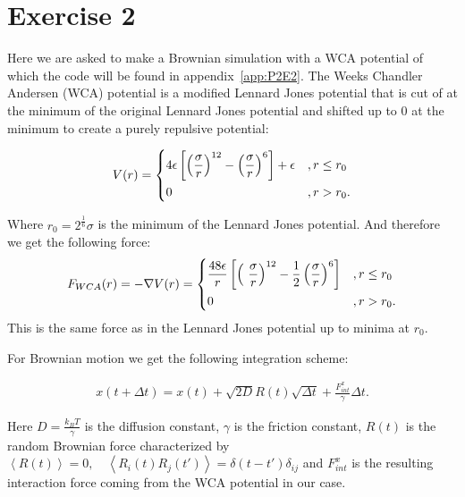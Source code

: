 \section{Exercise 2}\label{sect: P2E2}
Here we are asked to make a Brownian simulation with a WCA potential of which the code will be found in appendix~\ref{app:P2E2}.
The Weeks Chandler Andersen (WCA) potential is a modified Lennard Jones potential that is cut of at the minimum of the original Lennard Jones potential 
and shifted up to 0 at the minimum to create a purely repulsive potential:

\begin{align}
V(r) = \begin{dcases} 4 \epsilon \left[\left( \frac{\sigma}{r} \right)^{12} - \left( \frac{\sigma}{r} \right)^6\right] + \epsilon &,r \le  r_0 \\ 0  &,r > r_0. \end{dcases}
\end{align}\label{eq: WCA potential}

Where $r_0 = 2^{\frac{1}{6}} \sigma$ is the minimum of the Lennard Jones potential. And therefore we get the following force:
\begin{align}
F_{WCA}(r) = - \nabla V(r) = \begin{dcases} \frac{48 \epsilon}{r} \left[ \left(\ \frac{\sigma}{r}\right)^{12}-\frac{1}{2}\left(\frac{\sigma}{r}\right)^6\right]   &,r \le  r_0 \\ 0  &,r > r_0. \end{dcases}
\end{align}\label{eq: WCA force}
This is the same force as in the Lennard Jones potential up to minima at $r_0$.

For Brownian motion we get the following integration scheme:

\begin{align}
    x(t +\Delta t) = x(t) + \sqrt{2D}R(t)\sqrt{\Delta t} + \frac{F^x_{int}}{\gamma} \Delta t.
\end{align}\label{eq: brownian integration}

Here $D = \frac{k_BT}{\gamma}$ is the diffusion constant, $\gamma$ is the friction constant, $R(t)$ is the random Brownian force characterized by $\left\langle R(t)\right\rangle = 0,\quad \left\langle R_i(t)R_j(t')\right\rangle = \delta(t-t')\delta_{ij}$
and $F^x_{int}$ is the resulting interaction force coming from the WCA potential in our case.


